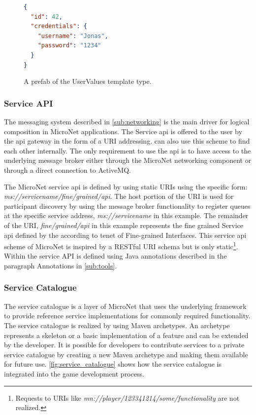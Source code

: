 \begin{figure}
\begin{lstlisting}[language=json,firstnumber=1] 
{
  "id": 42,
  "credentials": {
    "username": "Jonas",
    "password": "1234"
  }
}
\end{lstlisting}
\caption{A prefab of the UserValues template type.}
\label{lst:prefab_type}
\end{figure}



\subsubsection{Service API}

The messaging system described in \autoref{sub:networking} is the main driver
for logical composition in MicroNet applications. The Service \gls{api} is
offered to the user by the \gls{api} gateway in the form of a URI addressing. \mss{}
can also use this scheme to find each other internally. The only requirement to
use the \gls{api} is to have access to the underlying message broker either
through the MicroNet networking component or through a direct connection to
ActiveMQ.

The MicroNet service \gls{api} is defined by using static URIs using the
specific form: \textit{ms://servicename/fine/grained/api}. The host portion of
the URI is used for participant discovery by using the message broker
functionality to register queues at the specific service address,
\textit{ms://servicename} in this example. The remainder of the URI,
\textit{fine/grained/api} in this example represents the fine grained Service
\gls{api} defined by the \ms{} according to tenet of Fine-grained Interfaces.
This service \gls{api} scheme of MicroNet is inspired by a RESTful URI schema but is
only static\footnote{Requests to URIs like
\textit{mn://player/123341214/some/functionality} are not realized.}. Within
\mss{} the service API is defined using Java annotations described in the
paragraph Annotations in \autoref{sub:tools}.

\subsubsection{Service Catalogue}

The service catalogue is a layer of MicroNet that uses the underlying framework
to provide reference service implementations for commonly required
functionality. The service catalogue is realized by using Maven archetypes. An
archetype represents a skeleton or a basic implementation of a feature and can
be extended by the developer. It is possible for developers to contribute
services to a private service catalogue by creating a new Maven archetype and
making them available for future use. \autoref{fig:service_catalogue} shows
how the service catalogue is integrated into the game development process.

